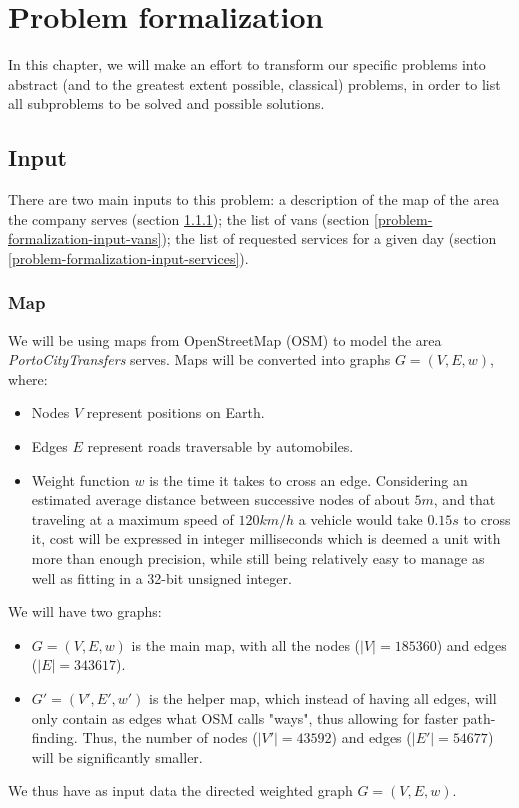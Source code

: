 \chapter{Problem formalization} \label{problem-formalization}
In this chapter, we will make an effort to transform our specific problems into abstract (and to the greatest extent possible, classical) problems, in order to list all subproblems to be solved and possible solutions.
\section{Input} \label{problem-formalization-input}
There are two main inputs to this problem: a description of the map of the area the company serves (section \ref{problem-formalization-input-map}); the list of vans (section \ref{problem-formalization-input-vans}); the list of requested services for a given day (section \ref{problem-formalization-input-services}).
\subsection{Map} \label{problem-formalization-input-map}
We will be using maps from OpenStreetMap (OSM) to model the area \emph{PortoCityTransfers} serves.
Maps will be converted into graphs $G=(V,E, w)$, where:
\begin{itemize}
    \item Nodes $V$ represent positions on Earth.
    \item Edges $E$ represent roads traversable by automobiles.
    \item Weight function $w$ is the time it takes to cross an edge. Considering an estimated average distance between successive nodes of about $5 m$, and that traveling at a maximum speed of $120 km/h$ a vehicle would take $0.15 s$ to cross it, cost will be expressed in integer milliseconds which is deemed a unit with more than enough precision, while still being relatively easy to manage as well as fitting in a 32-bit unsigned integer.
\end{itemize}
We will have two graphs:
\begin{itemize}
    \item $G=(V,E,w)$ is the main map, with all the nodes ($|V|=185360$) and edges ($|E|=343617$).
    \item $G'=(V',E',w')$ is the helper map, which instead of having all edges, will only contain as edges what OSM calls "ways", thus allowing for faster path-finding. Thus, the number of nodes ($|V'|=43592$) and edges ($|E'|=54677$) will be significantly smaller.
\end{itemize}
We thus have as input data the directed weighted graph $G=(V,E,w)$.
